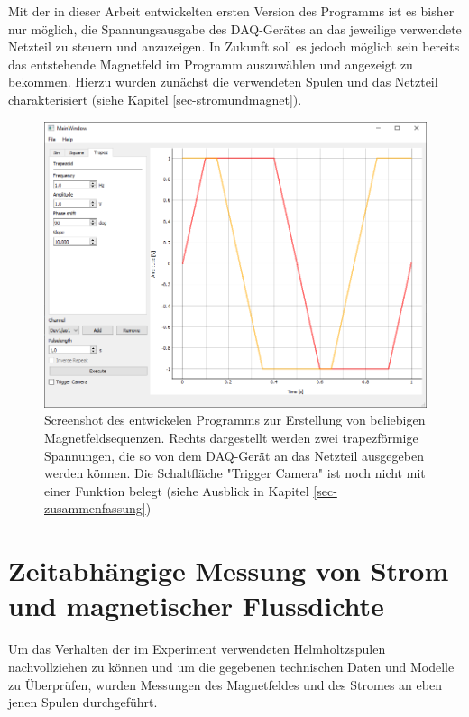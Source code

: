 \documentclass[page,pdftex,12pt,a4paper,twoside,openright]{scrbook}
\begin{document}
Mit der in dieser Arbeit entwickelten ersten Version des Programms ist es bisher nur möglich, die Spannungsausgabe des DAQ-Gerätes an das jeweilige verwendete Netzteil zu steuern und anzuzeigen. In Zukunft soll es jedoch möglich sein bereits das entstehende Magnetfeld im Programm auszuwählen und angezeigt zu bekommen. Hierzu wurden zunächst die verwendeten Spulen und das Netzteil charakterisiert (siehe Kapitel \ref{sec-stromundmagnet}).

\begin{figure}[H]
\centering
\includegraphics[width=\textwidth]{img/prog.png}
\caption{\label{fig-prog}
Screenshot des entwickelen Programms zur Erstellung von beliebigen Magnetfeldsequenzen. Rechts dargestellt werden zwei trapezförmige Spannungen, die so von dem DAQ-Gerät an das Netzteil ausgegeben werden können. Die Schaltfläche "Trigger Camera" ist noch nicht mit einer Funktion belegt (siehe Ausblick in Kapitel \ref{sec-zusammenfassung})}
\end{figure}

\section{Zeitabhängige Messung von Strom und magnetischer Flussdichte \label{sec-stromundmagnet}}
\label{sec:org33a7f96}
Um das Verhalten der im Experiment verwendeten Helmholtzspulen nachvollziehen zu können und um die gegebenen technischen Daten und Modelle zu Überprüfen, wurden Messungen des Magnetfeldes und des Stromes an eben jenen Spulen durchgeführt.
\end{document}
